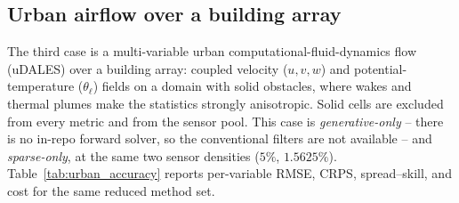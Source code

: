 \subsection{Urban airflow over a building array}
\label{subsec:results_urban}
The third case is a multi-variable urban computational-fluid-dynamics flow (uDALES) over a building array: coupled velocity ($u,v,w$) and potential-temperature ($\theta_\ell$) fields on a domain with solid obstacles, where wakes and thermal plumes make the statistics strongly anisotropic. Solid cells are excluded from every metric and from the sensor pool. This case is \emph{generative-only} -- there is no in-repo forward solver, so the conventional filters are not available -- and \emph{sparse-only}, at the same two sensor densities ($5\%$, $1.5625\%$). Table~\ref{tab:urban_accuracy} reports per-variable RMSE, CRPS, spread--skill, and cost for the same reduced method set.


